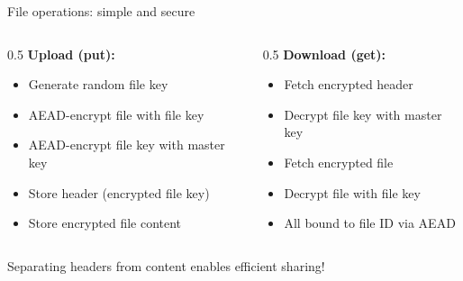 \ifdefined\PRESENTATION\else\PassOptionsToClass{handout}{beamer}\fi\documentclass[aspectratio=169, lualatex]{beamer}
\begin{document}
\begin{frame}{File operations: simple and secure}
	\begin{columns}[c]
		\begin{column}{0.5\textwidth}
			\textbf{Upload (put):}
			\begin{itemize}
				\item Generate random file key
				\item AEAD-encrypt file with file key
				\item AEAD-encrypt file key with master key
				\item Store header (encrypted file key)
				\item Store encrypted file content
			\end{itemize}
		\end{column}
		\begin{column}{0.5\textwidth}
			\textbf{Download (get):}
			\begin{itemize}
				\item Fetch encrypted header
				\item Decrypt file key with master key
				\item Fetch encrypted file
				\item Decrypt file with file key
				\item All bound to file ID via AEAD
			\end{itemize}
		\end{column}
	\end{columns}
	\vspace{0.5cm}
	\begin{center}
		Separating headers from content enables efficient sharing!
	\end{center}
\end{frame}
\end{document}

